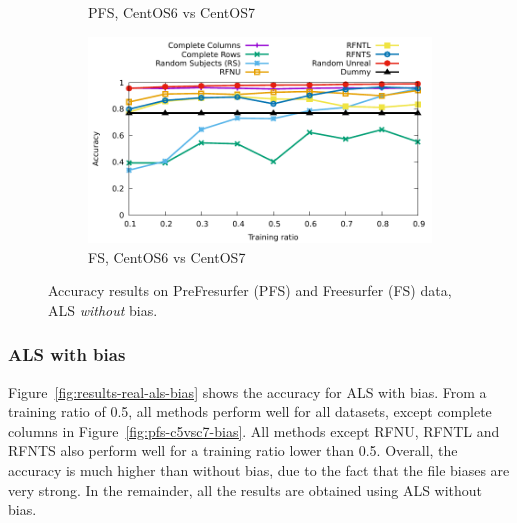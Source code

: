 \documentclass[10pt, conference, compsocconf]{IEEEtran}
\begin{document}
\begin{figure}
\begin{subfigure}[b]{\columnwidth}
        \caption{PFS, CentOS6 vs CentOS7}
\end{subfigure}\hfill
\begin{subfigure}[b]{\columnwidth}
        \includegraphics[width=0.8\columnwidth]{data/results/means_of_results/ALS/FS-100files/ALS-FS100files.pdf}
        \caption{FS, CentOS6 vs CentOS7}
\end{subfigure}
\caption{Accuracy results on PreFresurfer (PFS) and Freesurfer (FS) data, ALS \emph{without} bias.}
\label{fig:results-real-als}
\end{figure}

\subsubsection{ALS with bias}

Figure~\ref{fig:results-real-als-bias} shows the accuracy for ALS with 
bias. From a training ratio of 0.5, all methods perform well for all 
datasets, except complete columns in 
Figure~\ref{fig:pfs-c5vsc7-bias}. All methods except RFNU, RFNTL and 
RFNTS also perform well for a training ratio lower than 0.5. Overall, 
the accuracy is much higher than without bias, due to the fact that the 
file biases are very strong. In the remainder, all the 
results are obtained using ALS without bias.
\end{document}
